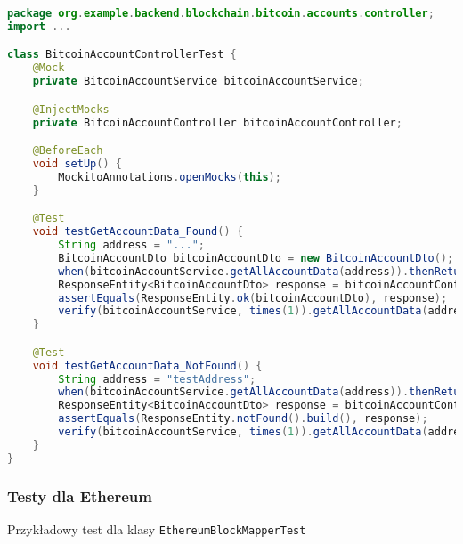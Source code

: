\begin{lstlisting}[language=Java, style=JavaStyle]
package org.example.backend.blockchain.bitcoin.accounts.controller;
import ...

class BitcoinAccountControllerTest {
    @Mock
    private BitcoinAccountService bitcoinAccountService;

    @InjectMocks
    private BitcoinAccountController bitcoinAccountController;

    @BeforeEach
    void setUp() {
        MockitoAnnotations.openMocks(this);
    }

    @Test
    void testGetAccountData_Found() {
        String address = "...";
        BitcoinAccountDto bitcoinAccountDto = new BitcoinAccountDto();
        when(bitcoinAccountService.getAllAccountData(address)).thenReturn(bitcoinAccountDto);
        ResponseEntity<BitcoinAccountDto> response = bitcoinAccountController.getAccountData(address);
        assertEquals(ResponseEntity.ok(bitcoinAccountDto), response);
        verify(bitcoinAccountService, times(1)).getAllAccountData(address);
    }

    @Test
    void testGetAccountData_NotFound() {
        String address = "testAddress";
        when(bitcoinAccountService.getAllAccountData(address)).thenReturn(null);
        ResponseEntity<BitcoinAccountDto> response = bitcoinAccountController.getAccountData(address);
        assertEquals(ResponseEntity.notFound().build(), response);
        verify(bitcoinAccountService, times(1)).getAllAccountData(address);
    }
}
\end{lstlisting}

\subsubsection{Testy dla Ethereum}
Przykładowy test dla klasy \texttt{EthereumBlockMapperTest}

